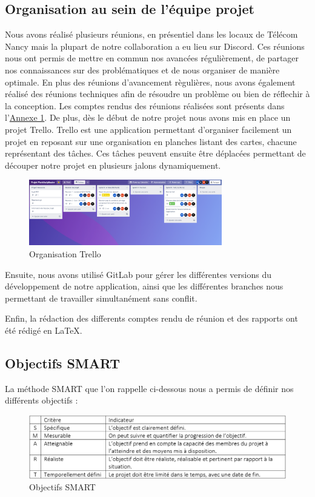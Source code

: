 \documentclass[french,a4paper]{article}
\begin{document}
\subsection{Organisation au sein de l’équipe projet}
Nous avons réalisé plusieurs réunions, en présentiel dans les locaux de Télécom Nancy mais la plupart de notre collaboration a eu lieu sur Discord. Ces réunions nous ont permis de mettre en commun nos avancées régulièrement, de partager nos connaissances sur des problématiques et de nous organiser de manière optimale.
En plus des réunions d'avancement règulières, nous avons également réalisé des réunions techniques afin de résoudre un problème ou bien de réflechir à la conception.
Les comptes rendus des réunions réalisées sont présents dans l’\hyperlink{annexe1}{Annexe 1}.
De plus, dès le début de notre projet nous avons mis en place un projet Trello. Trello est une application permettant d’organiser facilement un projet en reposant sur une organisation en planches listant des cartes, chacune représentant des tâches. Ces tâches peuvent ensuite être déplacées permettant de découper notre projet en plusieurs jalons dynamiquement.
\begin{figure}[H]
    \centering
    \includegraphics[width=0.75\textwidth]{img/trello.png}
    \caption{Organisation Trello}
\end{figure}

Ensuite, nous avons utilisé GitLab pour gérer les différentes versions du développement de notre application, ainsi que les différentes branches nous permettant de travailler simultanément sans conflit.

Enfin, la rédaction des differents comptes rendu de réunion et des rapports ont été rédigé en \LaTeX.

\subsection{Objectifs SMART}
La méthode SMART que l'on rappelle ci-dessous nous a permis de définir nos différents objectifs :

\begin{figure}[H]
    \centering
    \includegraphics[width=1\textwidth]{img/SMART.png}
    \caption{Objectifs SMART}
\end{figure}
\end{document}
